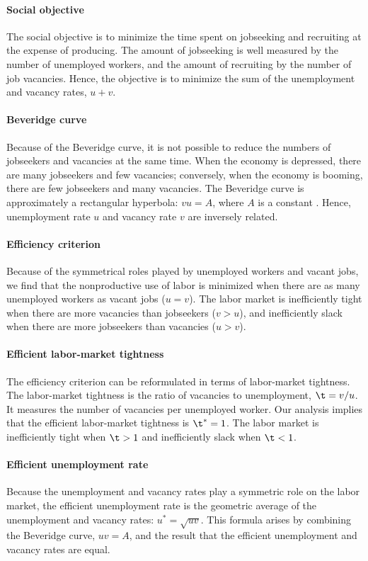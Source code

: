 \documentclass[letterpaper,12pt,leqno]{article}
\begin{document}
\paragraph{Social objective} The social objective is to minimize the time spent on jobseeking and recruiting at the expense of producing. The amount of jobseeking is well measured by the number of unemployed workers, and the amount of recruiting by the number of job vacancies. Hence, the objective is to minimize the sum of the unemployment and vacancy rates, $u + v$.

\paragraph{Beveridge curve} Because of the Beveridge curve, it is not possible to reduce the numbers of jobseekers and vacancies at the same time. When the economy is depressed, there are many jobseekers and few vacancies; conversely, when the economy is booming, there are few jobseekers and many vacancies. The Beveridge curve is approximately a rectangular hyperbola:  $vu = A$, where $A$ is a constant \citep[figure 6]{MS16}. Hence, unemployment rate $u$ and vacancy rate $v$ are inversely related.

\paragraph{Efficiency criterion} Because of the symmetrical roles played by unemployed workers and vacant jobs, we find that the nonproductive use of labor is minimized when there are as many unemployed workers as vacant jobs ($u = v$). The labor market is inefficiently tight when there are more vacancies than jobseekers ($v > u$), and inefficiently slack when there are more jobseekers than vacancies ($u > v$).

\paragraph{Efficient labor-market tightness} The efficiency criterion can be reformulated in terms of labor-market tightness. The labor-market tightness is the ratio of vacancies to unemployment, $\t = v/u$. It measures the number of vacancies per unemployed worker. Our analysis implies that the efficient labor-market tightness is $\t^* = 1$. The labor market is inefficiently tight when $\t > 1$ and inefficiently slack when $\t < 1$. 

\paragraph{Efficient unemployment rate} Because the unemployment and vacancy rates play a symmetric role on the labor market, the efficient unemployment rate is the geometric average of the unemployment and vacancy rates: $u^* = \sqrt{uv}$. This formula arises by combining the Beveridge curve, $uv = A$, and the result that the efficient unemployment and vacancy rates are equal. 
\end{document}
